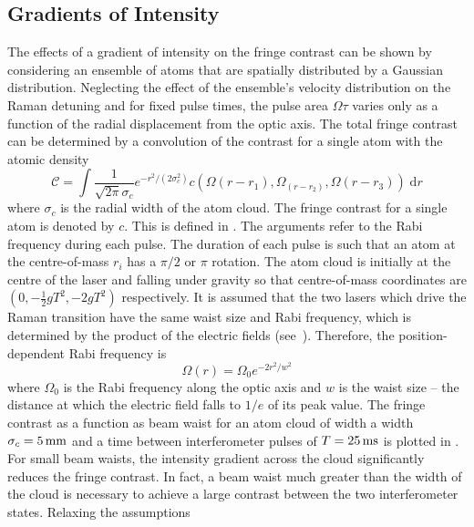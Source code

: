 \subsection{Gradients of Intensity}\label{subsec:fringe_beam_size}
The effects of a gradient of intensity on the fringe contrast can be shown by
considering an ensemble of atoms that are spatially distributed by a Gaussian
distribution. Neglecting the effect of the ensemble's velocity distribution on
the Raman detuning and for fixed pulse times, the pulse area \(\Omega \tau\)
varies only as a function of the radial displacement from the optic axis. The
total fringe contrast can be determined by a convolution of the contrast for a
single atom with the atomic density
\begin{equation}
	\mathcal{C} = \int \frac{1}{\sqrt{2\pi}\sigma_c}e^{-r^2/(2\sigma_c^2)} c\left(\Omega(r-r_1),\Omega_(r-r_2),\Omega(r-r_3)\right) \;\mathrm{d}r
	\label{eq:cloud_contrast}
\end{equation}
where \(\sigma_c\) is the radial width of the atom cloud.
The fringe contrast for a single atom is denoted by $c$. This is
defined in . The arguments refer to
the Rabi frequency during each pulse. The duration of each pulse is
such that an atom at the centre-of-mass $r_i$ has a $\pi/2$ or $\pi$
rotation. The atom cloud is initially at the
centre of the laser and falling under gravity so that centre-of-mass coordinates are
\(\left(0, -\frac{1}{2}g T^2, -2 g T^2\right)\) respectively. It is
assumed that the two lasers which drive the Raman transition have the same
waist size and Rabi frequency, which is determined by the product of the
electric fields (see~). Therefore, the
position-dependent Rabi frequency is
\begin{equation}
	\Omega(r) = \Omega_0 e^{-2 r^2/w^2}
\end{equation}
where \(\Omega_0\) is the Rabi frequency along the optic axis and \(w\) is the
waist size -- the distance at which the electric field falls to \(1/e\) of its
peak value. The fringe contrast as a function as beam waist for an atom cloud of
width a width \(\sigma_c = \sivalue{5}{\milli\metre}\) and a time between
interferometer pulses of \(T = \sivalue{25}{\milli\second}\) is plotted in
. For small beam waists, the intensity
gradient across the cloud significantly reduces the fringe contrast. In fact, a
beam waist much greater than the width of the cloud is necessary to achieve a
large contrast between the two interferometer states. Relaxing the assumptions
